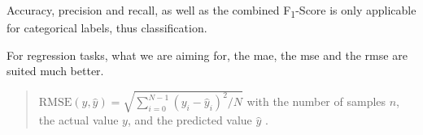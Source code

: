 Accuracy, precision and recall, as well as the combined F\textsubscript{1}-Score is only applicable for categorical labels, thus classification.

For regression tasks, what we are aiming for, the \gls{mae}, the \gls{mse} and the \gls{rmse} are suited much better.

\begin{quote}
\begin{math}
\text{RMSE}(y, \hat{y}) = \sqrt{\sum_{i=0}^{N - 1} (y_i - \hat{y}_i)^2 / N }
\end{math}\newline
with the number of samples $n$, the actual value $y$, and the predicted value $\hat{y}$ \cite{MAE_RMSE}.
\end{quote}

